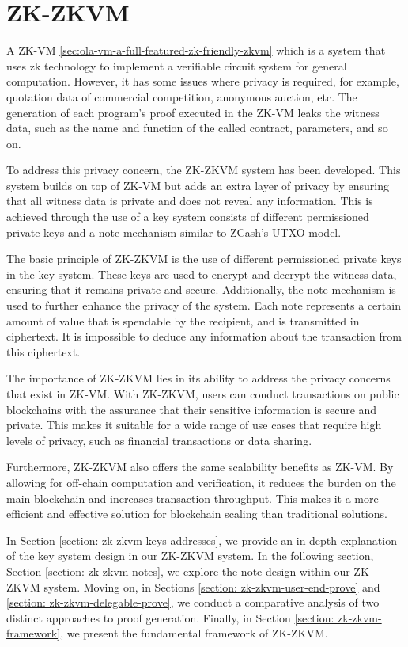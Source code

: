 \section{ZK-ZKVM} \label{sec:zk-zkvm}

A ZK-VM \ref{sec:ola-vm-a-full-featured-zk-friendly-zkvm} which is a system that uses zk technology to implement a verifiable circuit system for general computation. However, it has some issues where privacy is required, for example, quotation data of commercial competition, anonymous auction, etc. The generation of each program's proof executed in the ZK-VM leaks the witness data, such as the name and function of the called contract, parameters, and so on.

To address this privacy concern, the ZK-ZKVM system has been developed. This system builds on top of ZK-VM but adds an extra layer of privacy by ensuring that all witness data is private and does not reveal any information. This is achieved through the use of a key system consists of different permissioned private keys and a note mechanism similar to ZCash's UTXO model.

The basic principle of ZK-ZKVM is the use of different permissioned private keys in the key system. These keys are used to encrypt and decrypt the witness data, ensuring that it remains private and secure. Additionally, the note mechanism is used to further enhance the privacy of the system. Each note represents a certain amount of value that is spendable by the recipient, and is transmitted in ciphertext. It is impossible to deduce any information about the transaction from this ciphertext.

The importance of ZK-ZKVM lies in its ability to address the privacy concerns that exist in ZK-VM. With ZK-ZKVM, users can conduct transactions on public blockchains with the assurance that their sensitive information is secure and private. This makes it suitable for a wide range of use cases that require high levels of privacy, such as financial transactions or data sharing.

Furthermore, ZK-ZKVM also offers the same scalability benefits as ZK-VM. By allowing for off-chain computation and verification, it reduces the burden on the main blockchain and increases transaction throughput. This makes it a more efficient and effective solution for blockchain scaling than traditional solutions.

In Section \ref{section: zk-zkvm-keys-addresses}, we provide an in-depth explanation of the key system design in our ZK-ZKVM system. In the following section, Section \ref{section: zk-zkvm-notes}, we explore the note design within our ZK-ZKVM system. Moving on, in Sections \ref{section: zk-zkvm-user-end-prove} and \ref{section: zk-zkvm-delegable-prove}, we conduct a comparative analysis of two distinct approaches to proof generation. Finally, in Section \ref{section: zk-zkvm-framework}, we present the fundamental framework of ZK-ZKVM.






